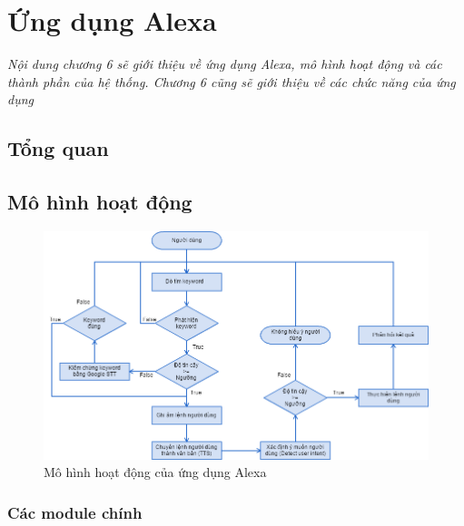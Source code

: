 \chapter{Ứng dụng Alexa}
\ifpdf
    \graphicspath{{Chapter6/Chapter6Figs/PNG/}{Chapter6/Chapter6Figs/PDF/}{Chapter6/Chapter6Figs/}}
\else
    \graphicspath{{Chapter6/Chapter6Figs/EPS/}{Chapter6/Chapter6Figs/}}
\fi

\textit{Nội dung chương 6 sẽ giới thiệu về ứng dụng Alexa, mô hình hoạt động và các thành phần của hệ thống. Chương 6 cũng sẽ giới thiệu về các chức năng của ứng dụng}

\section{Tổng quan}

\section{Mô hình hoạt động}
\begin{figure}[H]
    \centering
    \includegraphics[scale=0.5]{system_flowchart}
    \caption{Mô hình hoạt động của ứng dụng Alexa}
    \label{fig:c6_system_flowchart}
\end{figure}

\subsection{Các module chính}
